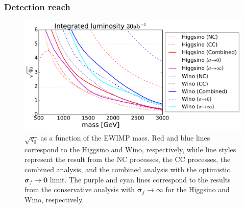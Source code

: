 \documentclass[12pt,twoside,book]{article}
\begin{document}
\subsubsection{Detection reach}
\label{sec_detection}

\begin{figure}[t]
  \centering \includegraphics[width=0.7\hsize]{mchi_vs_sqq0.pdf}
  \caption{$\sqrt{q_0}$ as a function of the EWIMP mass.  Red and blue
  lines correspond to the Higgsino and Wino, respectively, while line
  styles represent the result from the NC processes, the CC processes,
  the combined analysis, and the combined analysis with the optimistic
  $\bm{\sigma}_f \to \bm{0}$ limit.  The purple and cyan lines
  correspond to the results from the conservative analysis with
  $\bm{\sigma}_f \to \infty$ for the Higgsino and Wino, respectively.}
  \label{fig_mchi_vs_sqq0}
\end{figure}
\end{document}
